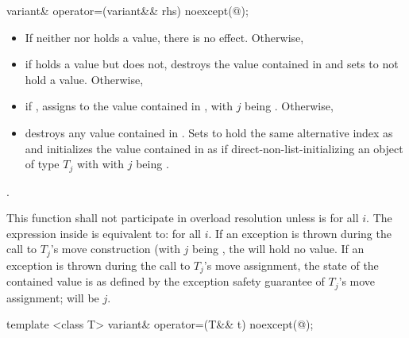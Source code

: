 %
\begin{itemdecl}
variant& operator=(variant&& rhs) noexcept(@\seebelow@);
\end{itemdecl}

\begin{itemdescr}
\pnum
\effects
\begin{itemize}
\item
If neither  nor  holds a value, there is no effect. Otherwise,
\item
if  holds a value but  does not, destroys the value
contained in  and sets  to not hold a value. Otherwise,
\item
if , assigns  to
the value contained in , with $j$ being . Otherwise,
\item
destroys any value contained in . Sets  to hold the
same alternative index as  and initializes the value contained in
 as if direct-non-list-initializing an object of type $T_j$
with  with $j$ being .
\end{itemize}

\pnum
\returns {}.

\pnum
\remarks
This function shall not participate in overload resolution unless
 is
 for all $i$.
The expression inside  is equivalent to:
 for all $i$.
If an exception is thrown during the call to $T_j$'s move construction
(with $j$ being , the  will hold no value.
If an exception is thrown during the call to $T_j$'s move assignment,
the state of the contained value is as defined by the exception safety
guarantee of $T_j$'s move assignment;  will be $j$.
\end{itemdescr}

%
\begin{itemdecl}
template <class T> variant& operator=(T&& t) noexcept(@\seebelow@);
\end{itemdecl}

